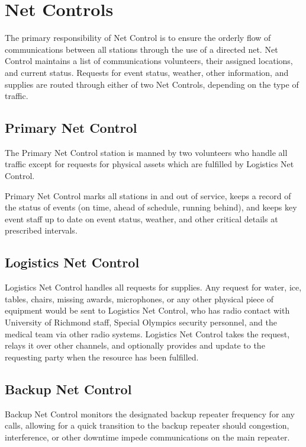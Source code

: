 \documentclass[pdflatex,letterpaper,twoside,12pt]{book}
\begin{document}
\section{Net Controls}

The primary responsibility of Net Control is to ensure the orderly flow of communications between all stations through the use of a directed net.  Net Control maintains a list of communications volunteers, their assigned locations, and current status.  Requests for event status, weather, other information, and supplies are routed through either of two Net Controls, depending on the type of traffic.

\subsection{Primary Net Control}

The Primary Net Control station is manned by two volunteers who handle all traffic except for requests for physical assets which are fulfilled by Logistics Net Control.

Primary Net Control marks all stations in and out of service, keeps a record of the status of events (on time, ahead of schedule, running behind), and keeps key event staff up to date on event status, weather, and other critical details at prescribed intervals.

\subsection{Logistics Net Control}

Logistics Net Control handles all requests for supplies.  Any request for water, ice, tables, chairs, missing awards, microphones, or any other physical piece of equipment would be sent to Logistics Net Control, who has radio contact with University of Richmond staff, Special Olympics security personnel, and the medical team via other radio systems.  Logistics Net Control takes the request, relays it over other channels, and optionally provides and update to the requesting party when the resource has been fulfilled.

\subsection{Backup Net Control}

Backup Net Control monitors the designated backup repeater frequency for any calls, allowing for a quick transition to the backup repeater should congestion, interference, or other downtime impede communications on the main repeater.
\end{document}
